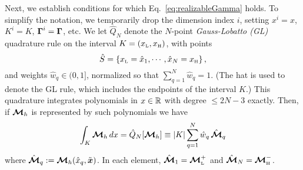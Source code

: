 Next, we establish conditions for which Eq.~\eqref{eq:realizableGamma} holds.  
To simplify the notation, we temporarily drop the dimension index $i$, setting $x^{i}=x$, $K^{i}=K$, $\boldsymbol{\Gamma}^{i}=\boldsymbol{\Gamma}$, etc.  
We let $\hat{Q}_{N}$ denote the $N$-point \emph{Gauss-Lobatto (GL)} quadrature rule on the interval $K=(x_{\mbox{\tiny L}},x_{\mbox{\tiny H}})$, with points
\begin{equation}
  \hat{S}=\left\{x_{\mbox{\tiny L}}=\hat{x}_{1},\cdots,\hat{x}_{N}=x_{\mbox{\tiny H}}\right\}, 
  \label{eq:quadraturePointsGL}
\end{equation}
and weights $\hat{w}_{q} \in (0,1]$, normalized so that $\sum_{q=1}^{N} \hat{w}_{q} = 1$.  
(The hat is used to denote the GL rule, which includes the endpoints of the interval $K$.)
This quadrature integrates polynomials in $x \in \mathbb{R}$ with degree $\le2N-3$ exactly.  
Then, if $\boldsymbol{\mathcal{M}}_{h}$ is represented by such polynomials we have
\begin{equation}
  \int_{K} \boldsymbol{\mathcal{M}}_{h}\,dx = \hat{Q}_{N}[\boldsymbol{\mathcal{M}}_{h}] \equiv
  |K| \sum_{q=1}^{N} \hat{w}_{q}\,\hat{\boldsymbol{\mathcal{M}}}_{q}
  \label{eq:quadratureRuleGL}
\end{equation}
where $\hat{\boldsymbol{\mathcal{M}}}_{q} := \boldsymbol{\mathcal{M}}_{h}(\hat{x}_q,\tilde{\boldsymbol{x}})$.  
In each element, $\hat{\boldsymbol{\mathcal{M}}}_{1}=\boldsymbol{\mathcal{M}}_{\mbox{\tiny L}}^{+}$ and $\hat{\boldsymbol{\mathcal{M}}}_{N}=\boldsymbol{\mathcal{M}}_{\mbox{\tiny H}}^{-}$.  

